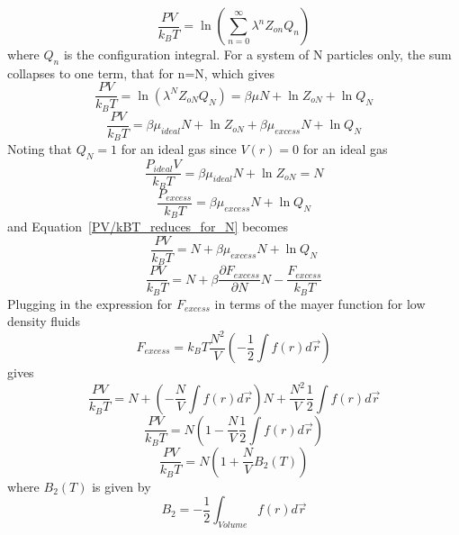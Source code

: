 \documentclass[double,12pt]{beavtex}
\begin{document}
\begin{equation}\frac{PV}{k_BT}=\ln{\left(\sum_{n=0}^\infty \lambda^nZ_{on}Q_n\right)} \end{equation}
where $Q_n$ is the configuration integral.
\color{red}For a system of N particles only, the sum collapses to one term, that for n=N, which gives \color{black}
\begin{equation}\label{PV/kBT_reduces_for_N}\frac{PV}{k_BT}=\ln{\left(\lambda^NZ_{oN}Q_N\right)}
=\beta\mu{N} + \ln{Z}_{oN} +\ln{Q}_N\end{equation}
\begin{equation}\label{PV/kBT_reduces_for_N}\frac{PV}{k_BT}=\beta\mu_{ideal}{N} + \ln{Z}_{oN} + \beta\mu_{excess}{N} + \ln{Q}_N\end{equation}
Noting that $Q_N=1$ for an ideal gas since $V(r)=0$ for an ideal gas
\begin{equation}\frac{P_{ideal}V}{k_BT}=\beta\mu_{ideal}{N} + \ln{Z}_{oN}=N\end{equation}
\begin{equation}\frac{P_{excess}}{k_BT}= \beta\mu_{excess}{N} + \ln{Q}_N\end{equation}
and Equation~\ref{PV/kBT_reduces_for_N} becomes
\begin{equation}\frac{PV}{k_BT}=N + \beta\mu_{excess}{N} + \ln{Q}_N\end{equation}
\begin{equation}\frac{PV}{k_BT}=N + \beta\frac{\partial{F}_{excess}}{\partial{N}}{N} - \frac{F_{excess}}{k_BT}\end{equation}
Plugging in the expression for $F_{excess}$ in terms of the mayer function for low density fluids
\begin{equation}F_{excess}=k_BT\frac{N^2}{V}\left(-\frac{1}{2}\int{f(r)d\vec{r}}\right)\end{equation}
gives
\begin{equation}\frac{PV}{k_BT}=N + \left(-\frac{N}{V}\int{f(r)d\vec{r}}\right){N} + \frac{N^2}{V}\frac{1}{2}\int{f(r)d\vec{r}}\end{equation}
\begin{equation}\frac{PV}{k_BT}=N\left(1-\frac{N}{V}\frac{1}{2}\int{f(r)d\vec{r}}\right)\end{equation}
\begin{equation}\frac{PV}{k_BT}=N\left(1+\frac{N}{V}B_2(T)\right) \end{equation}
where $B_2(T)$ is given by
\begin{equation}B_2=-\frac{1}{2}\int_{Volume}f(r)d\vec{r} \end{equation}
\end{document}
